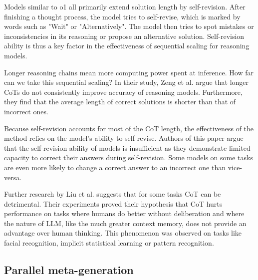 Models similar to o1 all primarily extend solution length by self-revision\cite{zeng2025revisitingtesttimescalingo1like}.
After finishing a thought process, the model tries to self-revise, which is marked by words such as "Wait" or "Alternatively". 
The model then tries to spot mistakes or inconsistencies in its reasoning or propose an alternative solution. 
Self-revision ability is thus a key factor in the effectiveness of sequential scaling for reasoning models\cite{zeng2025revisitingtesttimescalingo1like}.

Longer reasoning chains mean more computing power spent at inference. How far can we take this sequential scaling?
In their study, Zeng et al.\cite{zeng2025revisitingtesttimescalingo1like} argue that longer CoTs do not consistently improve accuracy of reasoning models.
Furthermore, they find that the average length of correct solutions is shorter than that of incorrect ones. 

Because self-revision accounts for most of the CoT length, the effectiveness of the method relies on the model's ability to self-revise.
Authors of this paper argue that the self-revision ability of models is insufficient as they demonstrate limited capacity to correct their answers
during self-revision. Some models on some tasks are even more likely to change a correct answer to an incorrect one than vice-versa.

Further research by Liu et al.\cite{liu2024mindstepbystep} suggests that for some tasks CoT can be detrimental.
Their experiments proved their hypothesis that CoT hurts performance on tasks where humans do better without deliberation
and where the nature of LLM, like the much greater context memory, does not provide an advantage over human thinking. 
This phenomenon was observed on tasks like facial recognition, implicit statistical learning or pattern recognition.

\subsection{Parallel meta-generation}

